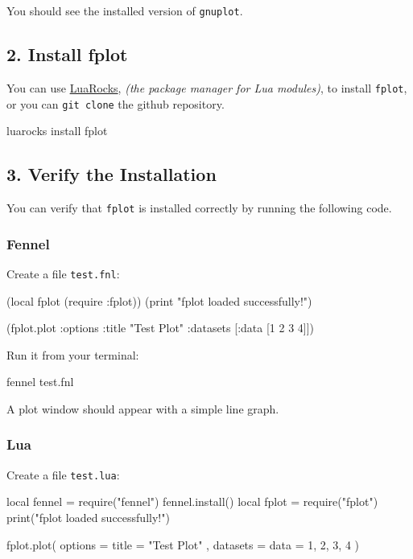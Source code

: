 \documentclass[12pt, letterpaper]{article}
\begin{document}
	You should see the installed version of \texttt{gnuplot}.
	
	\subsection{2. Install fplot}
	
	You can use \href{https://luarocks.org/}{LuaRocks}, \textit{(the package manager for Lua modules)}, to install \texttt{fplot}, or you can \texttt{git clone} the github repository.
	
	\begin{bashcode}
luarocks install fplot
	\end{bashcode}
	
	\subsection{3. Verify the Installation}
	
	You can verify that \texttt{fplot} is installed correctly by running the following code.
	
	\subsubsection*{Fennel}
	
	Create a file \texttt{test.fnl}:
	
	\begin{fennelcode}
(local fplot (require :fplot))
(print "fplot loaded successfully!")

(fplot.plot
{:options {:title "Test Plot"}
	:datasets [{:data [1 2 3 4]}]})
	\end{fennelcode}
	
	Run it from your terminal:
	
	\begin{bashcode}
fennel test.fnl
	\end{bashcode}
	
	A plot window should appear with a simple line graph.
	
	\subsubsection*{Lua}
	
	Create a file \texttt{test.lua}:
	
	\begin{luacode}
local fennel = require("fennel") fennel.install()
local fplot = require("fplot")
print("fplot loaded successfully!")

fplot.plot({
	options = { title = "Test Plot" },
	datasets = {
		{ data = {1, 2, 3, 4} }
	}
})
	\end{luacode}
	
\end{document}
